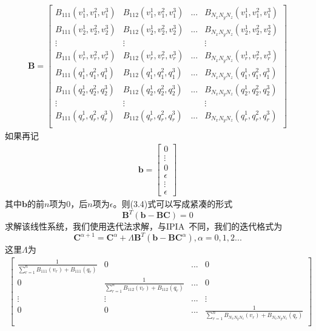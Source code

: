 \begin{align*}
    \mathbf{B} = \begin{bmatrix}
        B_{111}(v_1^1,v_1^2,v_1^3) & B_{112}(v_1^1,v_1^2,v_1^3) &...& B_{N_xN_yN_z}(v_1^1,v_1^2,v_1^3)\\
        B_{111}(v_2^1,v_2^2,v_2^3) & B_{112}(v_2^1,v_2^2,v_2^3) &...& B_{N_xN_yN_z}(v_2^1,v_2^2,v_2^3)\\
         \vdots & \vdots & & \vdots\\
        B_{111}(v_r^1,v_r^2,v_r^3) & B_{112}(v_r^1,v_r^2,v_r^3) &...& B_{N_xN_yN_z}(v_r^1,v_r^2,v_r^3)\\
        B_{111}(q_1^1,q_1^2,q_1^3) & B_{112}(q_1^1,q_1^2,q_1^3) &...& B_{N_xN_yN_z}(q_1^1,q_1^2,q_1^3)\\
        B_{111}(q_2^1,q_2^2,q_2^3) & B_{112}(q_2^1,q_2^2,q_2^3) &...& B_{N_xN_yN_z}(q_2^1,q_2^2,q_2^3)\\
        \vdots & \vdots & & \vdots\\
        B_{111}(q_r^1,q_r^2,q_r^3) & B_{112}(q_r^1,q_r^2,q_r^3) &...& B_{N_xN_yN_z}(q_r^1,q_r^2,q_r^3)\\
    \end{bmatrix}
\end{align*}
如果再记
\begin{align*}
    \mathbf{b} = \begin{bmatrix}
        0\\
        \vdots\\
        0\\
        \epsilon \\
        \vdots \\
        \epsilon
    \end{bmatrix}
\end{align*}
其中$\mathbf{b}$的前$n$项为$0$，后$n$项为$\epsilon$。则(3.4)式可以写成紧凑的形式
\begin{equation}
    \mathbf{B}^T ( \mathbf{b} - \mathbf{B} \mathbf{C}) = 0    
\end{equation}
求解该线性系统，我们使用迭代法求解，与IPIA~\cite{hamza2020implicit}不同，我们的迭代格式为
\begin{equation}
\mathbf{C}^{\alpha + 1} = \mathbf{C}^{\alpha} + \Lambda \mathbf{B}^T(\mathbf{b} - \mathbf{B}\mathbf{C}^{\alpha}) , \alpha = 0,1,2...
\end{equation}
这里$\Lambda$为
\begin{equation}
    \begin{split}
        \begin{bmatrix}
            \frac{1}{\sum_{r = 1}^n B_{111}(v_r) +B_{111}(q_r)} & 0 & ... & 0\\
            0 & \frac{1}{\sum_{r = 1}^n B_{112}(v_r) +B_{112}(q_r)} & ... & 0\\
            \vdots & \vdots & ... & \vdots \\
            0 & 0 & ... & \frac{1}{\sum_{r = 1}^n B_{N_xN_yN_z}(v_r) +B_{N_xN_yN_z}(q_r)} \\
        \end{bmatrix}
    \end{split}
\end{equation}
